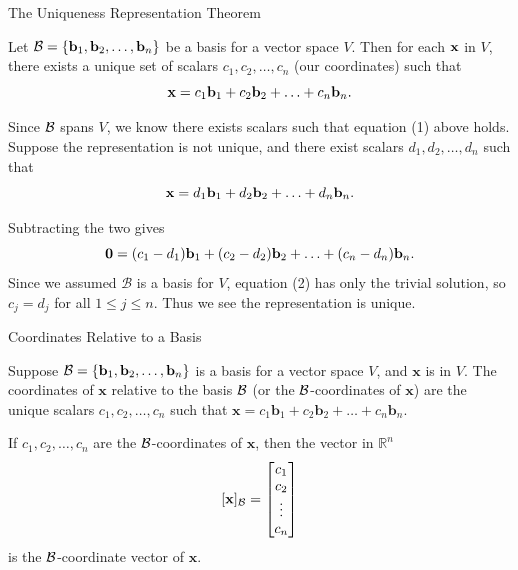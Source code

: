\documentclass[xcolor=dvipsnames,aspectratio=169,t]{beamer}
\begin{document}
\begin{frame}{The Uniqueness Representation Theorem}
  \begin{theorem}
  Let $\mathcal{B} = \left\{ \mathbf{b}_1,\mathbf{b}_2,\ldots,\mathbf{b}_n \right\}$ be a basis for a vector space $V$.
  Then for each $\mathbf{x}$ in $V$, there exists a \alert{unique set of scalars} $c_1, c_2, \ldots, c_n$ (our coordinates) such that
  \begin{equation}
  \mathbf{x} = c_1 \mathbf{b}_1 + c_2 \mathbf{b}_2 + \ldots + c_n \mathbf{b}_n.
  \end{equation}
  \end{theorem}

  \pause
  Since $\mathcal{B}$ spans $V$, we know there exists scalars such that equation (1) above holds. Suppose the representation is not unique, and there exist scalars $d_1, d_2, \ldots , d_n$ such that
  \[ \mathbf{x} = d_1 \mathbf{b}_1 + d_2 \mathbf{b}_2 + \ldots + d_n \mathbf{b}_n.\]
  \vspace*{-2.5em}
  
  \pause
  Subtracting the two gives
  \begin{equation}
  \mathbf{0} = (c_1 - d_1) \mathbf{b}_1 +  (c_2 - d_2) \mathbf{b}_2 +  \ldots +  (c_n - d_n) \mathbf{b}_n.
  \end{equation}
  Since we assumed $\mathcal{B}$ is a basis for $V$, equation (2) has only the trivial solution, so $c_j=d_j$ for all $1 \leq j \leq n$.
  Thus we see the representation is \alert{unique}.
  \hfill\blue{\qed}
\end{frame}


\begin{frame}{Coordinates Relative to a Basis}
  \begin{definition}
  Suppose $\mathcal{B} = \left\{ \mathbf{b}_1,  \mathbf{b}_2, \ldots ,  \mathbf{b}_n \right\}$ is a basis for a vector space $V$, and $\mathbf{x}$ is in $V$. The \alert{coordinates of $\mathbf{x}$ relative to the basis $\mathcal{B}$} (or the \alert{$\mathcal{B}$-coordinates of $\mathbf{x}$}) are the unique scalars $c_1, c_2, \ldots , c_n$ such that $\mathbf{x} = c_1 \mathbf{b}_1 + c_2 \mathbf{b}_2 + \ldots + c_n \mathbf{b}_n$.
  \end{definition}

\begin{definition}
If $c_1, c_2, \ldots , c_n$  are the $\mathcal{B}$-coordinates of $\mathbf{x}$, then the vector in $\mathbb{R}^n$
\[ \lbrack \mathbf{x} \rbrack_{\mathcal{B}} = \begin{bmatrix} c_1 \\ c_2 \\ \vdots \\ c_n \end{bmatrix} \]
is the \alert{$\mathcal{B}$-coordinate vector of $\mathbf{x}$}.
\end{definition}

\end{frame}
\end{document}
